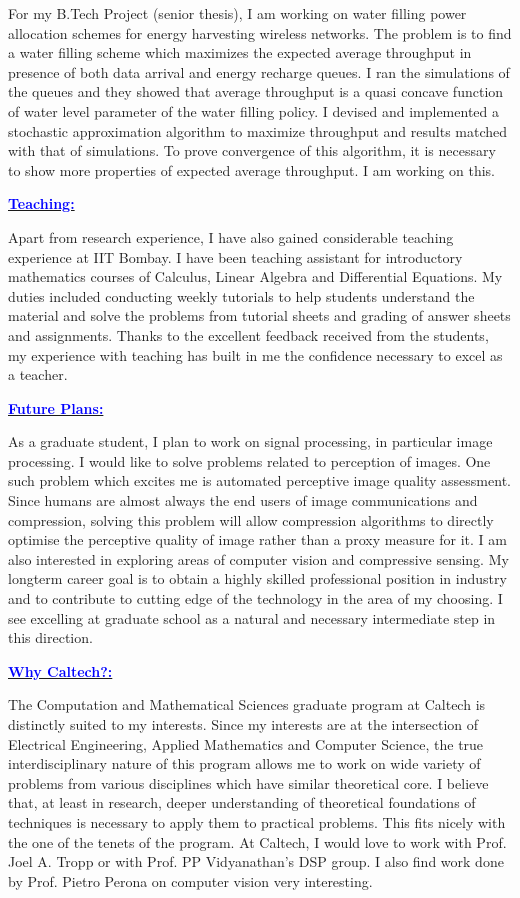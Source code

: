 \documentclass[11pt]{article}
\newcommand{\statement}[1]{\par\medskip
  \underline{\textcolor{blue}{\textbf{#1:}}}\space
}
\begin{document}
For my B.Tech Project (senior thesis), I am working on water filling power allocation schemes for energy harvesting wireless networks. 
The problem is to find a water filling scheme which maximizes the expected average throughput in presence of both data arrival and energy recharge queues. 
I ran the simulations of the queues and they showed that average throughput is a quasi concave function of water level parameter of the water filling policy. 
I devised and implemented a stochastic approximation algorithm to maximize throughput and results matched with that of simulations. 
To prove convergence of this algorithm, it is necessary to show more properties of expected average throughput. I am working on this.

\statement{Teaching}
Apart from research experience, I have also gained considerable teaching experience at IIT Bombay. 
I have been teaching assistant for introductory mathematics courses of Calculus, Linear Algebra and Differential Equations. 
My duties included conducting weekly tutorials to help students understand the material and solve the problems from tutorial sheets and grading of answer sheets and assignments.
Thanks to the excellent feedback received from the students, my experience with teaching has built in me the confidence necessary to excel as a teacher.

\statement{Future Plans}
As a graduate student, I plan to work on signal processing, in particular image processing. 
I would like to solve problems related to perception of images. One such problem which excites me is automated perceptive image quality assessment.
Since humans are almost always the end users of image communications and compression, solving this problem will allow compression algorithms to directly optimise the perceptive quality of image rather than a proxy measure for it. 
I am also interested in exploring areas of computer vision and compressive sensing. 
My longterm career goal is to obtain a highly skilled professional position in industry and to contribute to cutting edge of the technology in the area of my choosing. 
I see excelling at graduate school as a natural and necessary intermediate step in this direction.

\statement{Why Caltech?}
The Computation and Mathematical Sciences graduate program at Caltech is distinctly suited to my interests. 
Since my interests are at the intersection of Electrical Engineering, Applied Mathematics and Computer Science, the true interdisciplinary nature of this program allows me to work on wide variety of problems from various disciplines which have similar theoretical core. 
I believe that, at least in research, deeper understanding of theoretical foundations of techniques is necessary to apply them to practical problems.
This fits nicely with the one of the tenets of the program. 
At Caltech, I would love to work with Prof. Joel A. Tropp or with Prof. PP Vidyanathan's DSP group. I also find work done by Prof. Pietro Perona on computer vision very interesting.
\end{document}
